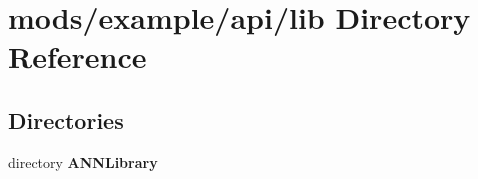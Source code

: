 \section{mods/example/api/lib Directory Reference}
\label{dir_d424503b40da7503459d639f0c192912}
\subsection*{Directories}
\begin{DoxyCompactItemize}
\item 
directory {\bf A\+N\+N\+Library}
\end{DoxyCompactItemize}
